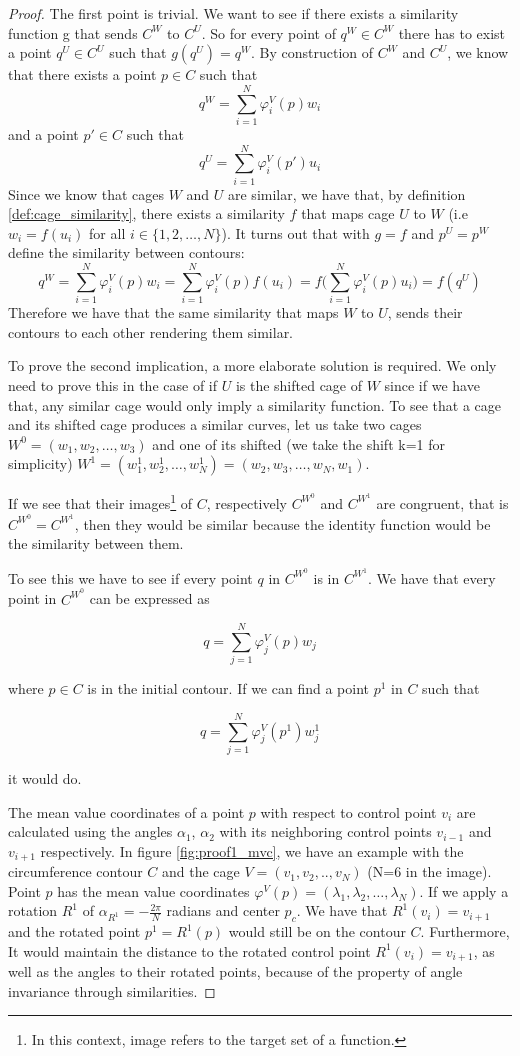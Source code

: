 \begin{proof}
	The first point is trivial. We want to see if there exists a similarity function g that sends $C^W$ to $C^U$. So for every point of $q^W\in C^W$ there has to exist a point $q^U \in C^U$ such that $g(q^U)=q^W$. 
	By construction of $C ^W$ and $C^U$, we know that there exists a point $p\in C$ such that $$q^W=\sum\limits_{i=1}^N\varphi_i^V(p)w_i$$
	 and a point $p'\in C$ such that 
	 $$q^U=\sum\limits_{i=1}^N\varphi_i^V(p')u_i$$
	 Since we know that cages $W$ and $U$ are similar, we have that, by definition \ref{def:cage_similarity}, there exists a similarity $f$ that maps cage $U$ to $W$ (i.e $w_i=f(u_i)$ for all $i \in \{1,2, \dots, N\}$). It turns out that with $g=f$ and $p^U=p^W$ define the similarity between contours:
	 $$q^W=\sum\limits_{i=1}^N\varphi_i^V(p)w_i=\sum\limits_{i=1}^N\varphi_i^V(p)f(u_i)=f\Big(\sum\limits_{i=1}^N\varphi_i^V(p)u_i\Big)=f(q^U)$$
	 Therefore we have that the same similarity that maps $W$ to $U$, sends their contours to each other rendering them similar.
	
	To prove the second implication, a more elaborate solution is required. We only need to prove this in the case of if $U$ is the shifted cage of $W$ since if we have that, any similar cage would only imply a similarity function.
	To see that a cage and its shifted cage produces a similar curves, let us take two cages $W^0=(w_1, w_2, \dots, w_3)$  and one of its shifted (we take the shift k=1 for simplicity) $W^1=(w_1^1,w_2^1,\dots, w_N^1)=(w_2,w_3, \dots, w_N, w_1)$.
	
	If we see that their images\footnote{In this context, image refers to the target set of a function.} of $C$, respectively $C^{W^0}$ and $C^{W^1}$ are congruent, that is $C^{W^0}=C^{W^1}$, then they would be similar because the identity function would be the similarity between them.
	
	To see this we have to see if every point $q$ in $C^{W^0}$ is in $C^{W^1}$.
	We have that every point in $C^{W^0}$ can be expressed as 

		$$q=\sum\limits_{j=1}^N\varphi_j^V(p)w_j$$

	where $p \in C$ is in the initial contour. If we can find a point $p^1$ in $C$ such that
	
		$$q=\sum\limits_{j=1}^N\varphi_j^V(p^1)w_j^1$$
	
	it would do.
 
  
  The mean value coordinates of a point $p$ with respect to control point $v_i$ are calculated using the angles $\alpha_1$, $\alpha_2$ with its neighboring control points $v_{i-1}$ and $v_{i+1}$ respectively. In figure \ref{fig:proof1_mvc}, we have an example with the circumference contour $C$ and the cage $V=(v_1,v_2,..,v_N)$  (N=6 in the image). Point $p$ has the mean value coordinates $\varphi^V(p)=(\lambda_1,\lambda_2, \dots, \lambda_N)$. If we apply a rotation $R^1$ of $\alpha_{R^1}=-\frac{2\pi}{N}$ radians and center $p_c$. We have that $R^1(v_i)=v_{i+1}$ and the rotated point $p^1=R^1(p)$ would still be on the contour $C$. Furthermore, It would maintain the distance to the rotated control point $R^1(v_i)=v_{i+1}$, as well as the angles to their rotated points, because of the property of angle invariance through similarities.
  

\end{proof}

